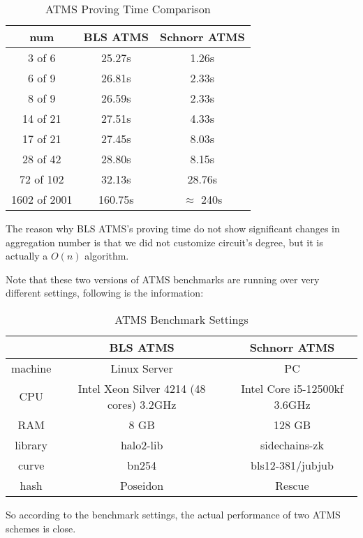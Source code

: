\documentclass{article}
\begin{document}
\begin{table}[htbp]
\centering
\begin{tabular}{c|c|c}
\hline
\textbf{num} & \textbf{BLS ATMS} & \textbf{Schnorr ATMS}  \\ \hline
3 of 6 & 25.27s & 1.26s  \\
6 of 9 & 26.81s & 2.33s  \\
8 of 9 & 26.59s & 2.33s \\
14 of 21 & 27.51s & 4.33s  \\
17 of 21 & 27.45s & 8.03s  \\
28 of 42 & 28.80s &8.15s  \\
72 of 102 & 32.13s & 28.76s  \\
1602 of 2001 & 160.75s &  $\approx$ 240s \\ \hline
\end{tabular}
\caption{ATMS Proving Time Comparison}
\end{table}


The reason why BLS ATMS's proving time do not show significant changes in aggregation number is that we did not customize circuit's degree, but it is actually a $O(n)$ algorithm. 

Note that these two versions of ATMS benchmarks are running over very different settings, following is the information:

\begin{table}[htbp]
\centering
\begin{tabular}{c|c|c}
\hline
\textbf{} & \textbf{BLS ATMS} & \textbf{Schnorr ATMS}  \\ \hline

machine & Linux Server & PC \\ \hline
CPU& Intel Xeon Silver 4214 (48 cores) 3.2GHz&Intel Core i5-12500kf 3.6GHz  \\
\hline
RAM & 8 GB& 128 GB \\ \hline
library & halo2-lib & sidechains-zk \\ \hline
curve & bn254& bls12-381/jubjub \\ \hline
hash& Poseidon& Rescue \\ \hline


\end{tabular}
\caption{ATMS Benchmark Settings}
\end{table}

So according to the benchmark settings, the actual performance of two ATMS schemes is close.
\end{document}
